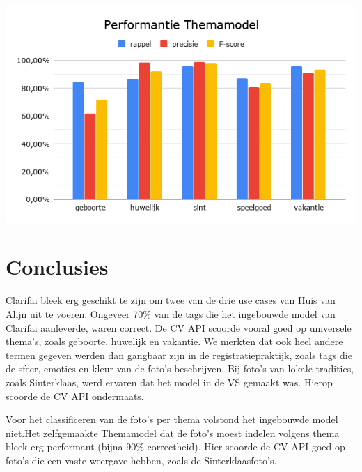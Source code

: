 \documentclass[a0,portrait]{a0poster}
\begin{document}
\begin{multicols}{2}
\begin{center}\vspace{1cm}
	\includegraphics[width=1.0\linewidth]{performantie_themamodel}
\end{center}\vspace{1cm}


\color{HoGentAccent1} 
\section*{Conclusies}
\color{black}
Clarifai bleek erg geschikt te zijn om twee van de drie use cases van Huis van Alijn uit te voeren. Ongeveer 70\% van de tags die het ingebouwde model van Clarifai aanleverde, waren correct. De CV API scoorde vooral goed op universele thema's, zoals geboorte, huwelijk en vakantie. We merkten dat ook heel andere termen gegeven werden dan gangbaar zijn in de registratiepraktijk, zoals tags die de sfeer, emoties en kleur van de foto's beschrijven. Bij foto's van lokale tradities, zoals Sinterklaas, werd ervaren dat het model in de VS gemaakt was. Hierop scoorde de CV API ondermaats. 

Voor het classificeren van de foto’s per thema volstond het ingebouwde model niet.Het zelfgemaakte Themamodel dat de foto's moest indelen volgens thema bleek erg performant (bijna 90\% correctheid). Hier scoorde de CV API goed op foto's die een vaste weergave hebben, zoals de Sinterklaasfoto's. 


\end{multicols}
\end{document}
